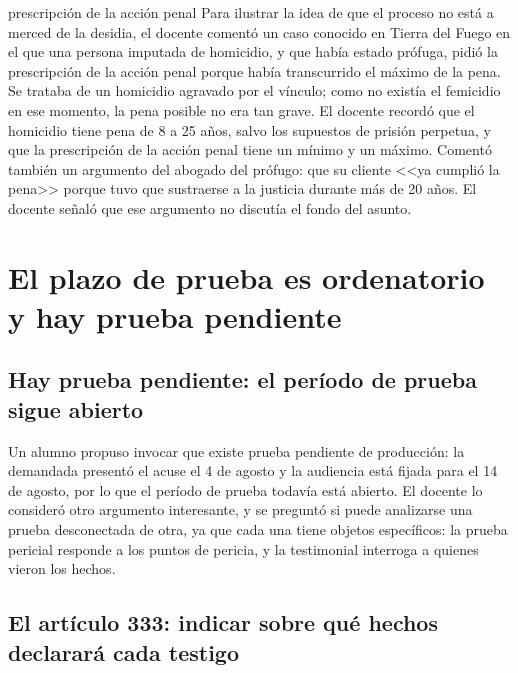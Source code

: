 \documentclass[12pt,oneside]{book}
\begin{document}
\begin{example}{prescripción de la acción penal}
Para ilustrar la idea de que el proceso no está a merced de la desidia, el docente comentó un caso conocido en Tierra del Fuego en el que una persona imputada de homicidio, y que había estado prófuga, pidió la prescripción de la acción penal porque había transcurrido el máximo de la pena. Se trataba de un homicidio agravado por el vínculo; como no existía el femicidio en ese momento, la pena posible no era tan grave. El docente recordó que el homicidio tiene pena de 8 a 25 años, salvo los supuestos de prisión perpetua, y que la prescripción de la acción penal tiene un mínimo y un máximo. Comentó también un argumento del abogado del prófugo: que su cliente <<ya cumplió la pena>> porque tuvo que sustraerse a la justicia durante más de 20 años. El docente señaló que ese argumento no discutía el fondo del asunto.
\end{example}


\section{El plazo de prueba es ordenatorio y hay prueba pendiente}

\subsection{Hay prueba pendiente: el período de prueba sigue abierto}

Un alumno propuso invocar que existe prueba pendiente de producción: la demandada presentó el acuse el 4 de agosto y la audiencia está fijada para el 14 de agosto, por lo que el período de prueba todavía está abierto. El docente lo consideró otro argumento interesante, y se preguntó si puede analizarse una prueba desconectada de otra, ya que cada una tiene objetos específicos: la prueba pericial responde a los puntos de pericia, y la testimonial interroga a quienes vieron los hechos.

\subsection{El artículo 333: indicar sobre qué hechos declarará cada testigo}
\end{document}
